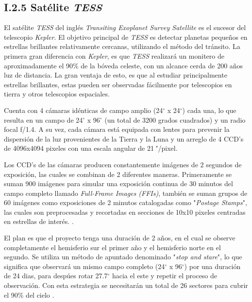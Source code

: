 \subsection*{I.2.5 Satélite \textit{TESS}}

El satélite \textit{TESS} del inglés \textit{Transiting Exoplanet Survey Satellite} es el sucesor del telescopio \textit{Kepler}. El objetivo principal de \textit{TESS} es detectar planetas pequeños en estrellas brillantes relativamente cercanas, utilizando el método del tránsito. La primera gran diferencia con \textit{Kepler}, es que \textit{TESS} realizará un monitero de aproximadamente el 90\% de la bóveda celeste, con un alcance cerda de 200 años luz de distancia. La gran ventaja de esto, es que al estudiar principalmente estrellas brillantes, estas pueden ser observadas fácilmente por telescopios en tierra y otros telescopios espaciales. 

Cuenta con 4 cámaras idénticas de campo amplio (24$^{\circ}$ x 24$^{\circ}$) cada una, lo que resulta en un campo de 24$^{\circ}$ x 96$^{\circ}$ (un total de 3200 grados cuadrados) y un radio focal f/1.4. A su vez, cada cámara está equipada con lentes para prevenir la dispersión de la luz provenientes de la Tierra y la Luna y un arreglo de 4 CCD’s de 4096x4094 pixeles con una escala angular de 21 \''/pixel.

Los CCD's de las cámaras producen constantemente imágenes de 2 segundos de exposición, las cuales se combinan de 2 diferentes maneras. Primeramente se suman 900 imágenes para simular una exposición continua de 30 minutos del campo completo llamado \textit{ Full-Frame Images (FFIs)}, también se suman grupos de 60 imágenes como exposiciones de 2 minutos catalogadas como "\textit{Postage Stamps}", las cuales son preprocesadas y recortadas en secciones de 10x10 pixeles centradas en estrellas de interés. \cite{ricker2014transiting}.

El plan es que el proyecto tenga una duración de 2 años, en el cual se observe completamente el hemisferio sur el primer año y el hemisferio norte en el segundo. Se utiliza un método de apuntado denominado "\textit{stop and stare}", lo que significa que observará un mismo campo completo (24$^{\circ}$ x 96$^{\circ}$) por una duración de 24 dias, para despúes rotar 27.7$^{\circ}$ hacia el este y repetir el proceso de observación. Con esta estrategia se necesitarán un total de 26 sectores para cubrir el 90\% del cielo \citep{schliegel2017tess}.


